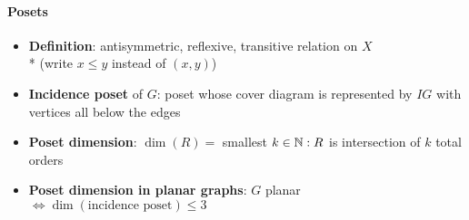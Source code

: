 \paragraph{Posets}
\begin{itemize}
  \item \textbf{Definition}: antisymmetric, reflexive, transitive relation on $ X $ \\* (write $ x \leq y $ instead of $ (x,y) $) 
  \item \textbf{Incidence poset} of $ G $: poset whose cover diagram is represented by $ IG $ with vertices all below the edges
  \item \textbf{Poset dimension}: $ \dim(R) = $ smallest $ k \in \mathbb{N} : R $ is intersection of $ k $ total orders
  \item \textbf{Poset dimension in planar graphs}: $ G $ planar $ \Leftrightarrow \dim(\text{incidence poset}) \leq 3 $
\end{itemize}
